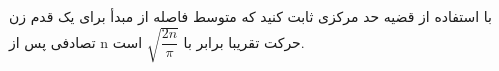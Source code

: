\problem{}
با استفاده از قضیه حد مرکزی ثابت کنید که متوسط فاصله از مبدأ برای یک قدم زن تصادفی
پس از n حرکت تقریبا برابر با $\sqrt{\dfrac{2n}{\pi}}$ است.